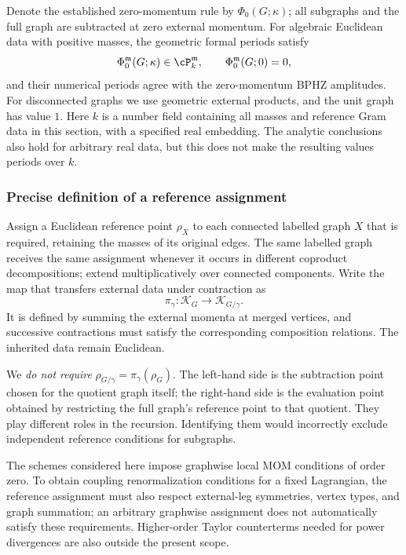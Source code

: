 \documentclass[11pt,a4paper,oneside]{article}
\theoremstyle{plain}
\theoremstyle{definition}
\theoremstyle{remark}
\numberwithin{equation}{section}
\begin{document}
Denote the established zero-momentum rule by $\Phi_0(G;\kappa)$; all subgraphs and the full graph are subtracted at zero external momentum.
For algebraic Euclidean data with positive masses, the geometric formal periods satisfy
\begin{equation}\label{finitemom:eq:zero}
 \Phi_0^{\mathfrak m}(G;\kappa)\in\cP_k^{\mathfrak m},
 \qquad \Phi_0^{\mathfrak m}(G;0)=0,
\end{equation}
and their numerical periods agree with the zero-momentum BPHZ amplitudes.
For disconnected graphs we use geometric external products, and the unit graph has value $1$.
Here $k$ is a number field containing all masses and reference Gram data in this section, with a specified real embedding.
The analytic conclusions also hold for arbitrary real data, but this does not make the resulting values periods over $k$.

\subsubsection{Precise definition of a reference assignment}
Assign a Euclidean reference point $\rho_X$ to each connected labelled graph $X$ that is required, retaining the masses of its original edges.
The same labelled graph receives the same assignment whenever it occurs in different coproduct decompositions; extend multiplicatively over connected components.
Write the map that transfers external data under contraction as
\begin{equation}\label{finitemom:eq:projection}
 \pi_\gamma:\mathcal K_G\longrightarrow\mathcal K_{G/\gamma}.
\end{equation}
It is defined by summing the external momenta at merged vertices, and successive contractions must satisfy the corresponding composition relations.
The inherited data remain Euclidean.

We \emph{do not require} $\rho_{G/\gamma}=\pi_\gamma(\rho_G)$.
The left-hand side is the subtraction point chosen for the quotient graph itself; the right-hand side is the evaluation point obtained by restricting the full graph's reference point to that quotient. They play different roles in the recursion.
Identifying them would incorrectly exclude independent reference conditions for subgraphs.

The schemes considered here impose graphwise local MOM conditions of order zero.
To obtain coupling renormalization conditions for a fixed Lagrangian, the reference assignment must also respect external-leg symmetries, vertex types, and graph summation; an arbitrary graphwise assignment does not automatically satisfy these requirements.
Higher-order Taylor counterterms needed for power divergences are also outside the present scope.
\end{document}
